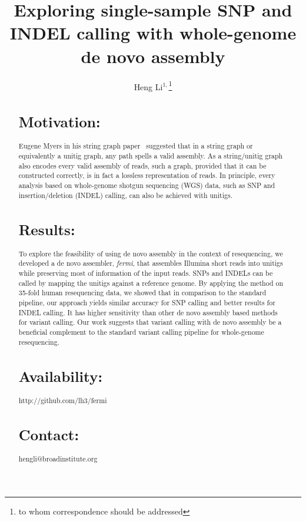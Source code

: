 \documentclass{bioinfo}
\begin{document}

\title[Variant calling from de novo assembly]{Exploring single-sample SNP and INDEL calling with
whole-genome de novo assembly}

\author[Li]{Heng Li$^{1,}$\footnote{to whom correspondence should be addressed}}

\address{$^1$Broad Institute, 7 Cambridge Center, Cambridge, MA 02142, USA}

\maketitle

\begin{abstract}

\section{Motivation:}
Eugene Myers in his string graph paper~\citep{Myers:2005bh} suggested that in a
string graph or equivalently a unitig graph, any path spells a valid assembly.
As a string/unitig graph also encodes every valid assembly of reads, such a
graph, provided that it can be constructed correctly, is in fact a lossless
representation of reads. In principle, every analysis based on whole-genome
shotgun sequencing (WGS) data, such as SNP and insertion/deletion (INDEL)
calling, can also be achieved with unitigs.

\section{Results:}
To explore the feasibility of using de novo assembly in the context of
resequencing, we developed a de novo assembler, \emph{fermi}, that assembles
Illumina short reads into unitigs while preserving most of information of the
input reads. SNPs and INDELs can be called by mapping the unitigs against a
reference genome. By applying the method on 35-fold human resequencing data,
we showed that in comparison to the standard pipeline, our approach yields
similar accuracy for SNP calling and better results for INDEL calling. It has
higher sensitivity than other de novo assembly based methods for variant
calling. Our work suggests that variant calling with de novo assembly be a
beneficial complement to the standard variant calling pipeline for whole-genome
resequencing.

\section{Availability:} http://github.com/lh3/fermi
\section{Contact:} hengli@broadinstitute.org
\end{abstract}
\end{document}
